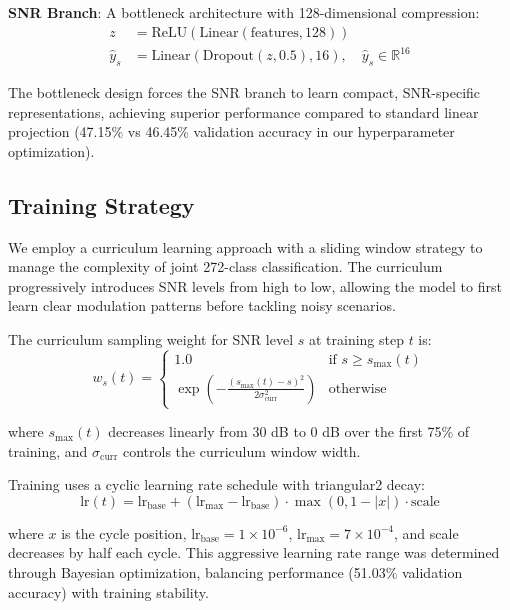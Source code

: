 \documentclass{ELSP}
\begin{document}
\textbf{SNR Branch}: A bottleneck architecture with 128-dimensional compression:
\begin{equation}
\begin{aligned}
z &= \text{ReLU}(\text{Linear}(\text{features}, 128)) \\
\hat{y}_s &= \text{Linear}(\text{Dropout}(z, 0.5), 16), \quad \hat{y}_s \in \mathbb{R}^{16}
\end{aligned}
\end{equation}

The bottleneck design forces the SNR branch to learn compact, SNR-specific representations, achieving superior performance compared to standard linear projection (47.15\% vs 46.45\% validation accuracy in our hyperparameter optimization).

\subsection{Training Strategy}

We employ a curriculum learning approach with a sliding window strategy to manage the complexity of joint 272-class classification. The curriculum progressively introduces SNR levels from high to low, allowing the model to first learn clear modulation patterns before tackling noisy scenarios.

The curriculum sampling weight for SNR level $s$ at training step $t$ is:
\begin{equation}
w_s(t) = \begin{cases}
1.0 & \text{if } s \geq s_{\text{max}}(t) \\
\exp\left(-\frac{(s_{\text{max}}(t) - s)^2}{2\sigma_{\text{curr}}^2}\right) & \text{otherwise}
\end{cases}
\end{equation}

where $s_{\text{max}}(t)$ decreases linearly from 30 dB to 0 dB over the first 75\% of training, and $\sigma_{\text{curr}}$ controls the curriculum window width.

Training uses a cyclic learning rate schedule with triangular2 decay:
\begin{equation}
\text{lr}(t) = \text{lr}_{\text{base}} + (\text{lr}_{\text{max}} - \text{lr}_{\text{base}}) \cdot \max(0, 1 - |x|) \cdot \text{scale}
\end{equation}

where $x$ is the cycle position, $\text{lr}_{\text{base}} = 1 \times 10^{-6}$, $\text{lr}_{\text{max}} = 7 \times 10^{-4}$, and scale decreases by half each cycle. This aggressive learning rate range was determined through Bayesian optimization, balancing performance (51.03\% validation accuracy) with training stability.
\end{document}
